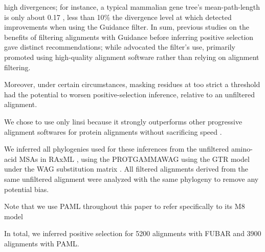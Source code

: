 


 high divergences; for instance, a typical mammalian gene tree's mean-path-length is only about 0.17 \citep{Spielman2013}, less than 10\% the divergence level at which \citet{Jordan2012} detected improvements when using the Guidance filter. In sum, previous studies on the benefits of filtering alignments with Guidance before inferring positive selection gave distinct recommendations; while \citet{Privman2012} advocated the filter's use, \citet{Jordan2012} primarily promoted using high-quality alignment software rather than relying on alignment filtering. 
 
 Moreover, under certain circumstances, masking residues at too strict a threshold had the potential to worsen positive-selection inference, relative to an unfiltered alignment.
 
We chose to use only linsi because it strongly outperforms other progressive alignment softwares for protein alignments without sacrificing speed \citep{Nuin2006,Thompson2011}. 

We inferred all phylogenies used for these inferences from the unfiltered amino-acid MSAs in RAxML \citep{Stamatakis2006}, using the PROTGAMMAWAG using the GTR model \citep{Stamatakis2006C} under the WAG substitution matrix \citep{Whelan2001}. All filtered alignments derived from the same unfiltered alignment were analyzed with the same phylogeny to remove any potential bias.

Note that we use PAML throughout this paper to refer specifically to its M8 model

In total, we inferred positive selection for 5200 alignments with FUBAR and 3900 alignments with PAML. %
